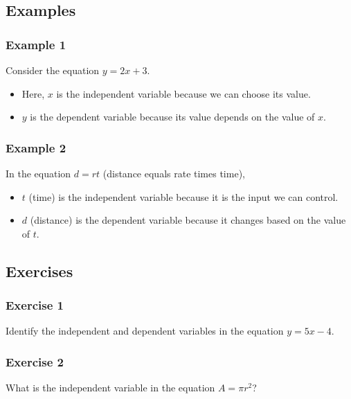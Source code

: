 \documentclass[12pt]{article}
\begin{document}
\subsection*{Examples}

\subsubsection*{Example 1}

Consider the equation \( y = 2x + 3 \).

\begin{itemize}
    \item Here, \( x \) is the independent variable because we can choose its value.
    \item \( y \) is the dependent variable because its value depends on the value of \( x \).
\end{itemize}

\subsubsection*{Example 2}

In the equation \( d = rt \) (distance equals rate times time),

\begin{itemize}
    \item \( t \) (time) is the independent variable because it is the input we can control.
    \item \( d \) (distance) is the dependent variable because it changes based on the value of \( t \).
\end{itemize}

\newpage

\subsection*{Exercises}

\subsubsection*{Exercise 1}

Identify the independent and dependent variables in the equation \( y = 5x - 4 \).

\subsubsection*{Exercise 2}

What is the independent variable in the equation \( A = \pi r^2 \)?
\end{document}
